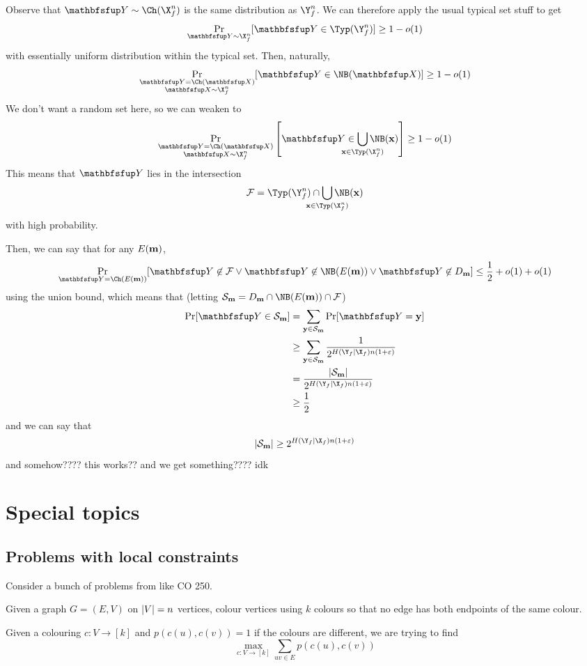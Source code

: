 \documentclass[class=co432,notes,tikz]{agony}
\begin{document}
\begin{prf}
  Observe that $\rvb Y \sim \Ch(\X_f^n)$ is the same distribution as $\Y_f^n$.
  We can therefore apply the usual typical set stuff to get
  \[ \Pr_{\rvb Y \sim \X_f^n}[\rvb Y \in \Typ(\Y_f^n)] \geq 1-o(1) \]
  with essentially uniform distribution within the typical set.
  Then, naturally,
  \[ \Pr_{\substack{\rvb Y = \Ch(\rvb X)\\\rvb X \sim \X_f^n}}[\rvb Y \in \NB(\rvb X)] \geq 1-o(1) \]
  We don't want a random set here, so we can weaken to
  \[ \Pr_{\substack{\rvb Y = \Ch(\rvb X)\\\rvb X \sim \X_f^n}}\qty[\rvb Y \in \bigcup_{\mathclap{\vb x \in \Typ(\X_f^n)}} \NB(\vb x)] \geq 1-o(1) \]
  This means that $\rvb Y$ lies in the intersection
  \[ \sv F = \Typ(\Y_f^n) \cap \bigcup_{\mathclap{\vb x \in \Typ(\X_f^n)}} \NB(\vb x) \]
  with high probability.

  Then, we can say that for any $E(\vb m)$,
  \[ \Pr_{\rvb Y = \Ch(E(\vb m))}[\rvb Y \not\in \sv F \lor \rvb Y \not\in \NB(E(\vb m)) \lor \rvb Y \not\in D_{\vb m}] \leq \frac12 + o(1) + o(1) \]
  using the union bound, which means that (letting $\sv S_{\vb m} = D_{\vb m}  \cap \NB(E(\vb m)) \cap \sv F$)
  \begin{align*}
    \Pr[\rvb Y \in \sv S_{\vb m}]
     & = \sum_{\vb y \in \sv S_{\vb m}} \Pr[\rvb Y = \vb y]                                \\
     & \geq \sum_{\vb y \in \sv S_{\vb m}} \frac{1}{2^{H(\Y_f \mid \X_f)n(1+\varepsilon)}} \\
     & = \frac{\abs{\sv S_{\vb m}}}{2^{H(\Y_f \mid \X_f)n(1+\varepsilon)}}                 \\
     & \geq \frac12
  \end{align*}
  and we can say that
  \[ \abs{\sv S_{\vb m}} \geq 2^{H(\Y_f \mid \X_f)n(1+\varepsilon)} \]
  and somehow???? this works?? and we get something???? idk
\end{prf}

\chapter{Special topics}

\section{Problems with local constraints}

Consider a bunch of problems from like CO 250.

\begin{example}[$k$-colouring]
  Given a graph $G = (E, V)$ on $\abs{V} = n$ vertices,
  colour vertices using $k$ colours so that no edge has both endpoints of the same colour.

  Given a colouring $c : V \to [k]$ and $p(c(u),c(v)) = 1$ if the colours are different,
  we are trying to find
  \[ \max_{c : V \to [k]} \sum_{uv \in E} p(c(u),c(v)) \]
\end{example}
\end{document}
